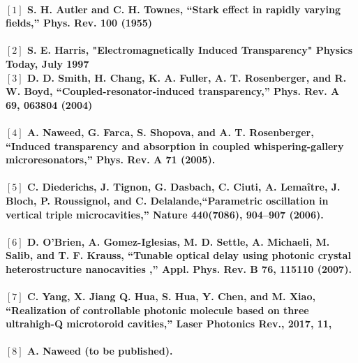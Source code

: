 \paragraph{\normalfont \large $[1]$ S. H. Autler and C. H. Townes, “Stark effect in rapidly varying fields,” Phys. Rev. \textbf{100} (1955) \\ 
\\$[2]$ S. E. Harris, "Electromagnetically Induced Transparency" Physics Today, July 1997
\\$[3]$ D. D. Smith, H. Chang, K. A. Fuller, A. T. Rosenberger, and R. W. Boyd, “Coupled-resonator-induced transparency,” Phys. Rev. A \textbf{69}, 063804 (2004) \\
\\$[4]$  A. Naweed, G. Farca, S. Shopova, and A. T. Rosenberger, “Induced transparency and absorption in coupled
whispering-gallery microresonators,” Phys. Rev. A \textbf{71} (2005).\\
\\$[5]$ C. Diederichs, J. Tignon, G. Dasbach, C. Ciuti, A. Lemaître, J. Bloch, P. Roussignol, and C. Delalande,“Parametric oscillation in vertical triple microcavities,” Nature \textbf{440}(7086), 904–907 (2006).\\
\\$[6]$ D. O’Brien, A. Gomez-Iglesias, M. D. Settle, A. Michaeli, M. Salib, and T. F. Krauss, “Tunable optical delay using photonic crystal heterostructure nanocavities ,” Appl. Phys. Rev. B \textbf{76}, 115110 (2007).\\
\\$[7]$ C. Yang,  X. Jiang Q. Hua, S. Hua, Y. Chen, and M. Xiao, “Realization of controllable photonic molecule based on three ultrahigh-Q microtoroid cavities,” Laser Photonics Rev., 2017, \textbf{11},\\
\\$[8]$ A. Naweed (to be published).}